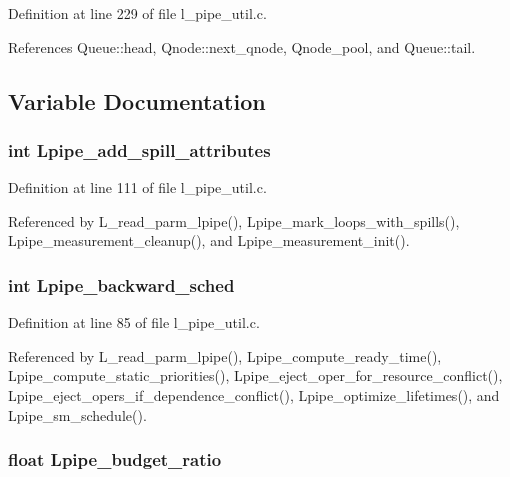 Definition at line 229 of file l\_\-pipe\_\-util.c.

References Queue::head, Qnode::next\_\-qnode, Qnode\_\-pool, and Queue::tail.

\subsection{Variable Documentation}
\subsubsection{\setlength{\rightskip}{0pt plus 5cm}int \bf{Lpipe\_\-add\_\-spill\_\-attributes}}\label{l__pipe__util_8h_e2d1368da174d6c3c8b7ec7d1cbbf44e}




Definition at line 111 of file l\_\-pipe\_\-util.c.

Referenced by L\_\-read\_\-parm\_\-lpipe(), Lpipe\_\-mark\_\-loops\_\-with\_\-spills(), Lpipe\_\-measurement\_\-cleanup(), and Lpipe\_\-measurement\_\-init().
\subsubsection{\setlength{\rightskip}{0pt plus 5cm}int \bf{Lpipe\_\-backward\_\-sched}}\label{l__pipe__util_8h_1ed5180823f3e497dbc3becd928690f5}




Definition at line 85 of file l\_\-pipe\_\-util.c.

Referenced by L\_\-read\_\-parm\_\-lpipe(), Lpipe\_\-compute\_\-ready\_\-time(), Lpipe\_\-compute\_\-static\_\-priorities(), Lpipe\_\-eject\_\-oper\_\-for\_\-resource\_\-conflict(), Lpipe\_\-eject\_\-opers\_\-if\_\-dependence\_\-conflict(), Lpipe\_\-optimize\_\-lifetimes(), and Lpipe\_\-sm\_\-schedule().
\subsubsection{\setlength{\rightskip}{0pt plus 5cm}float \bf{Lpipe\_\-budget\_\-ratio}}\label{l__pipe__util_8h_a50c2551f678955eabc6e79793268ffa}




